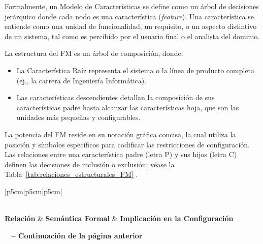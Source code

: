 {{{            Formalmente, un Modelo de Características se define como un árbol de
            decisiones jerárquico donde cada nodo es una característica (\textit{feature}). Una
            característica se entiende como una unidad de funcionalidad, un requisito, o un
            aspecto distintivo de un sistema, tal como es percibido por el usuario final o el
            analista del dominio.

            La estructura del \ac{FM} es un árbol de composición, donde:
            \begin{itemize}
                \item La Característica Raíz representa el sistema o la línea de producto
                completa (ej., la carrera de Ingeniería Informática).
                \item Las características descendientes detallan la composición de sus
                características padre hasta alcanzar las características hoja, que son las
                unidades más pequeñas y configurables.
            \end{itemize}

            La potencia del \ac{FM} reside en su notación gráfica concisa, la cual utiliza la
            posición y símbolos específicos para codificar las restricciones de
            configuración. Las relaciones entre una característica padre (letra P) y sus hijos (letra C) definen
            las decisiones de inclusión o exclusión; véase la Tabla~\ref{tab:relaciones_estructurales_FM} 
            \citep{pohl2005software, kang1990foda, benavides2010PrinciplesFM, benavides2010automated, wang2007FormalSemanticsFM}.
                        
            \begin{longtable}{|p{5cm}|p{5cm}|p{5cm}|}
                \caption{Notación semántica de las relaciones entre características de los \ac{FM}. Fuente: Elaboración propia. \label{tab:relaciones_estructurales_FM}}\\
                \hline
                \textbf{Relación} & \textbf{Semántica Formal} & \textbf{Implicación en la Configuración} \\
                \hline
                \endfirsthead
                
	            {{\bfseries \tablename\ \thetable{} -- Continuación de la página anterior}} \\
                

\end{longtable}}}}
